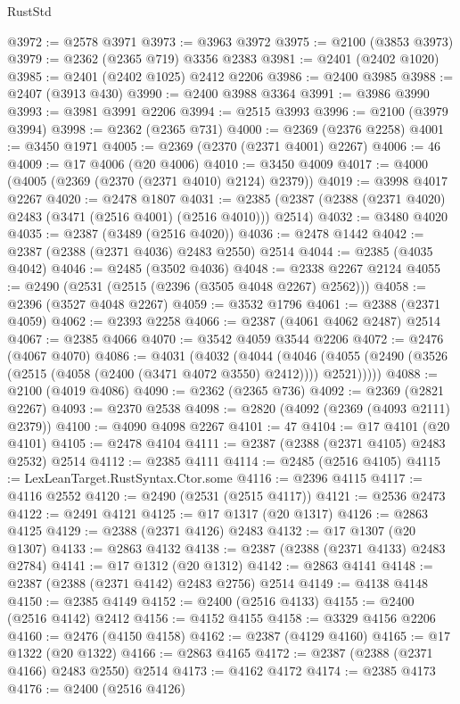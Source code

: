 \begin{lexlean}{RustStd}
\begin{coremodule}
{\begin{coremodule}
{{{{{{{{{{{{{{{{{{{{{{{{{{{{{{{{{{{{{{{{{{{{{{{{{{@3972 := @2578 @3971
@3973 := @3963 @3972
@3975 := @2100 (@3853 @3973)
@3979 := @2362 (@2365 @719) @3356 @2383
@3981 := @2401 (@2402 @1020)
@3985 := @2401 (@2402 @1025) @2412 @2206
@3986 := @2400 @3985
@3988 := @2407 (@3913 @430)
@3990 := @2400 @3988 @3364
@3991 := @3986 @3990
@3993 := @3981 @3991 @2206
@3994 := @2515 @3993
@3996 := @2100 (@3979 @3994)
@3998 := @2362 (@2365 @731)
@4000 := @2369 (@2376 @2258)
@4001 := @3450 @1971
@4005 := @2369 (@2370 (@2371 @4001) @2267)
@4006 := 46
@4009 := @17 @4006 (@20 @4006)
@4010 := @3450 @4009
@4017 := @4000 (@4005 (@2369 (@2370 (@2371 @4010) @2124) @2379))
@4019 := @3998 @4017 @2267
@4020 := @2478 @1807
@4031 := @2385 (@2387 (@2388 (@2371 @4020) @2483 (@3471 (@2516 @4001) (@2516 @4010))) @2514)
@4032 := @3480 @4020
@4035 := @2387 (@3489 (@2516 @4020))
@4036 := @2478 @1442
@4042 := @2387 (@2388 (@2371 @4036) @2483 @2550) @2514
@4044 := @2385 (@4035 @4042)
@4046 := @2485 (@3502 @4036)
@4048 := @2338 @2267 @2124
@4055 := @2490 (@2531 (@2515 (@2396 (@3505 @4048 @2267) @2562)))
@4058 := @2396 (@3527 @4048 @2267)
@4059 := @3532 @1796
@4061 := @2388 (@2371 @4059)
@4062 := @2393 @2258
@4066 := @2387 (@4061 @4062 @2487) @2514
@4067 := @2385 @4066
@4070 := @3542 @4059 @3544 @2206
@4072 := @2476 (@4067 @4070)
@4086 := @4031
    (@4032
      (@4044
        (@4046 (@4055 (@2490 (@3526 (@2515 (@4058 (@2400 (@3471 @4072 @3550) @2412)))) @2521)))))
@4088 := @2100 (@4019 @4086)
@4090 := @2362 (@2365 @736)
@4092 := @2369 (@2821 @2267)
@4093 := @2370 @2538
@4098 := @2820 (@4092 (@2369 (@4093 @2111) @2379))
@4100 := @4090 @4098 @2267
@4101 := 47
@4104 := @17 @4101 (@20 @4101)
@4105 := @2478 @4104
@4111 := @2387 (@2388 (@2371 @4105) @2483 @2532) @2514
@4112 := @2385 @4111
@4114 := @2485 (@2516 @4105)
@4115 := LexLeanTarget.RustSyntax.Ctor.some
@4116 := @2396 @4115
@4117 := @4116 @2552
@4120 := @2490 (@2531 (@2515 @4117))
@4121 := @2536 @2473
@4122 := @2491 @4121
@4125 := @17 @1317 (@20 @1317)
@4126 := @2863 @4125
@4129 := @2388 (@2371 @4126) @2483
@4132 := @17 @1307 (@20 @1307)
@4133 := @2863 @4132
@4138 := @2387 (@2388 (@2371 @4133) @2483 @2784)
@4141 := @17 @1312 (@20 @1312)
@4142 := @2863 @4141
@4148 := @2387 (@2388 (@2371 @4142) @2483 @2756) @2514
@4149 := @4138 @4148
@4150 := @2385 @4149
@4152 := @2400 (@2516 @4133)
@4155 := @2400 (@2516 @4142) @2412
@4156 := @4152 @4155
@4158 := @3329 @4156 @2206
@4160 := @2476 (@4150 @4158)
@4162 := @2387 (@4129 @4160)
@4165 := @17 @1322 (@20 @1322)
@4166 := @2863 @4165
@4172 := @2387 (@2388 (@2371 @4166) @2483 @2550) @2514
@4173 := @4162 @4172
@4174 := @2385 @4173
@4176 := @2400 (@2516 @4126)
}}}}}}}}}}}}}}}}}}}}}}}}}}}}}}}}}}}}}}}}}}}}}}}}}}
\end{coremodule}}
\end{coremodule}
\end{lexlean}
